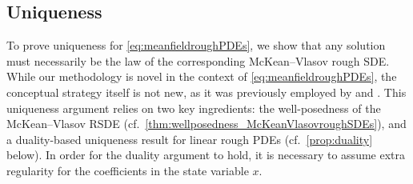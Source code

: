 \documentclass[10pt, a4paper]{article} %
\theoremstyle{definition}
\theoremstyle{plain}
\begin{document}
\subsection{Uniqueness} \label{section:uniqueness}
{
To prove uniqueness for \eqref{eq:meanfieldroughPDEs}, we show that any solution must necessarily be the law of the corresponding McKean--Vlasov rough SDE. While our methodology is novel in the context of \eqref{eq:meanfieldroughPDEs}, the conceptual strategy itself is not new, as it was previously employed by \cite{CG19} and \cite{CN21}.
This uniqueness argument relies on two key ingredients: the well-posedness of the McKean--Vlasov RSDE (cf.\ \cref{thm:wellposedness_McKeanVlasovroughSDEs}), and a duality-based uniqueness result for linear rough PDEs (cf.\ \cref{prop:duality} below).
In order for the duality argument to hold, it is necessary to assume extra regularity for the coefficients in the state variable $x$. 
}
\end{document}
